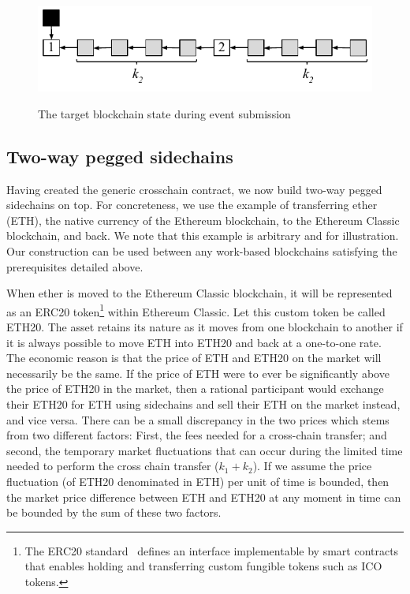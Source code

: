 \begin{figure}
    \caption{The target blockchain state during event submission}
    \centering
    \includegraphics[width=0.6 \columnwidth,keepaspectratio]{figures/contestation.pdf}
    \label{fig.contestation}
\end{figure}

\subsection*{Two-way pegged sidechains}
Having created the generic crosschain contract, we now build two-way pegged
sidechains on top. For concreteness, we use the example of transferring ether
(ETH), the native currency of the Ethereum blockchain, to the Ethereum Classic
blockchain, and back. We note that this example is arbitrary and for
illustration. Our construction can be used between any work-based blockchains
satisfying the prerequisites detailed above.

When ether is moved to the Ethereum Classic blockchain, it will be represented
as an ERC20 token\footnote{The ERC20 standard~\cite{erc20} defines an interface
implementable by smart contracts that enables holding and transferring custom
fungible tokens such as ICO tokens.} within Ethereum Classic. Let this custom
token be called ETH20. The asset retains its nature as it moves from one
blockchain to another if it is always possible to move ETH into ETH20 and back
at a one-to-one rate. The economic reason is that the price of ETH and ETH20 on
the market will necessarily be the same. If the price of ETH were to ever be
significantly above the price of ETH20 in the market, then a rational
participant would exchange their ETH20 for ETH using sidechains and sell their
ETH on the market instead, and vice versa. There can be a small discrepancy in
the two prices which stems from two different factors: First, the fees needed
for a cross-chain transfer; and second, the temporary market fluctuations that
can occur during the limited time needed to perform the cross chain transfer
($k_1 + k_2$). If we assume the price fluctuation (of ETH20 denominated in ETH)
per unit of time is bounded, then the market price difference between ETH and
ETH20 at any moment in time can be bounded by the sum of these two factors.


